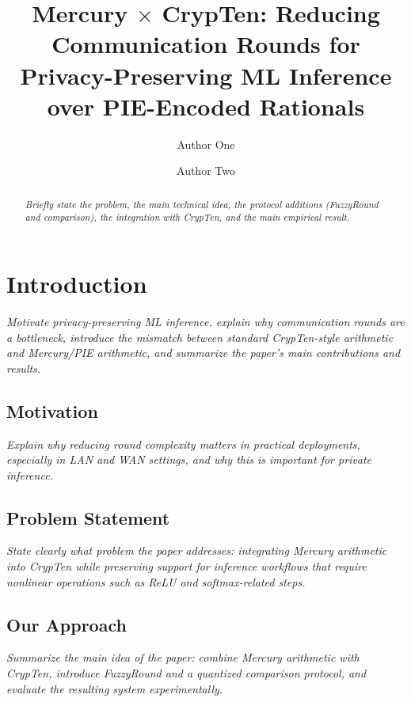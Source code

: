 




\title{Mercury \texorpdfstring{$\times$}{x} CrypTen: Reducing Communication Rounds for Privacy-Preserving ML Inference over PIE-Encoded Rationals}

\author{Author One \and Author Two}

\maketitle

\begin{abstract}
\textit{Briefly state the problem, the main technical idea, the protocol additions
(FuzzyRound and comparison), the integration with CrypTen, and the main empirical result.}
\end{abstract}

\section{Introduction}
\textit{Motivate privacy-preserving ML inference, explain why communication rounds are a bottleneck, introduce the mismatch between standard CrypTen-style arithmetic and Mercury/PIE arithmetic, and summarize the paper's main contributions and results.}

\subsection{Motivation}
\textit{Explain why reducing round complexity matters in practical deployments, especially in LAN and WAN settings, and why this is important for private inference.}

\subsection{Problem Statement}
\textit{State clearly what problem the paper addresses: integrating Mercury arithmetic into CrypTen while preserving support for inference workflows that require nonlinear operations such as ReLU and softmax-related steps.}

\subsection{Our Approach}
\textit{Summarize the main idea of the paper: combine Mercury arithmetic with CrypTen, introduce FuzzyRound and a quantized comparison protocol, and evaluate the resulting system experimentally.}

